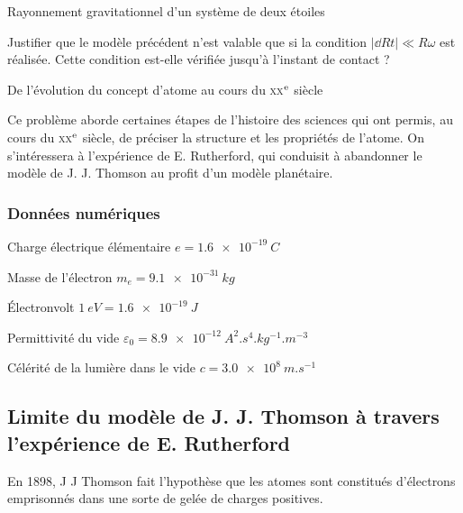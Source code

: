 \begin{exo}[PC][1][devoir]{Rayonnement gravitationnel d'un système de deux étoiles}
\begin{quest}
    \item Justifier que le modèle précédent n'est valable que si la condition $|\dd{R}{t}|\ll R {\omega}$
     est réalisée.
    Cette condition est-elle vérifiée jusqu'à l'instant de contact ?


    \end{quest}

\end{exo}

\begin{exo}[PC][1][devoir]{De l'évolution du concept d'atome au cours du \textsc{xx}$^{\rm e}$ siècle}

Ce problème aborde certaines étapes de l'histoire des sciences qui
ont permis, au cours du \textsc{xx}$^{\rm e}$ siècle, de préciser la structure et les
propriétés de l'atome. On s'intéressera
à l'expérience de E. Rutherford, qui conduisit à abandonner le modèle
de J. J. Thomson au profit d'un modèle planétaire.


\subsubsection*{Données numériques}


Charge électrique élémentaire $e=\SI{1,6e-19}{C}$

Masse de l'électron $m_{e}=\SI{9,1e-31}{kg}$

Électronvolt $\SI{1}{eV}=\SI{1,6e-19}{J}$

Permittivité du vide $\varepsilon_{0}=\SI{8,9e-12}{A^{2}.s^{4}.kg^{-1}.m^{-3}}$

Célérité de la lumière dans le vide $c=\SI{3,0e8}{m.s^{-1}}$


\subsection{Limite du modèle de J. J. Thomson à travers l'expérience de E. Rutherford}

En 1898, J J Thomson fait l'hypothèse que les atomes sont constitués
d'électrons emprisonnés dans une sorte de gelée de charges positives.


\end{exo}
